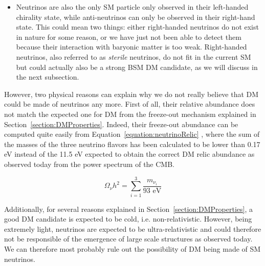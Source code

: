 \documentclass[a4paper, 10pt, openright]{report}
\begin{document}
\begin{itemize}
\item Neutrinos are also the only \ac{SM} particle only observed in their left-handed chirality state, while anti-neutrinos can only be observed in their right-hand state. This could mean two things: either right-handed neutrinos do not exist in nature for some reason, or we have just not been able to detect them because their interaction with baryonic matter is too weak. Right-handed neutrinos, also referred to as \textit{sterile} neutrinos, do not fit in the current \ac{SM} but could actually also be a strong \ac{BSM} \ac{DM} candidate, as we will discuss in the next subsection.

%
\end{itemize}

However, two physical reasons can explain why we do not really believe that \ac{DM} could be made of neutrinos any more. First of all, their relative abundance does not match the expected one for \ac{DM} from the freeze-out mechanism explained in Section~\ref{section:DMProperties}. Indeed, their freeze-out abundance can be computed quite easily from Equation~\ref{equation:neutrinoRelic} \cite{WIMPBook}, where the sum of the masses of the three neutrino flavors has been calculated to be lower than 0.17 eV \cite{NeutrinoMass} instead of the 11.5 eV expected to obtain the correct \ac{DM} relic abundance as observed today from the power spectrum of the \ac{CMB}. 

\begin{equation}
\label{equation:neutrinoRelic}
\Omega_\nu h^2 = \sum_{i=1}^3 \frac{m_{\nu_i}}{93 \text{ eV}}
\end{equation}

Additionally, for several reasons explained in Section~\ref{section:DMProperties}, a good \ac{DM} candidate is expected to be cold, i.e. non-relativistic. However, being extremely light, neutrinos are expected to be ultra-relativistic and could therefore not be responsible of the emergence of large scale structures as observed today. We can therefore most probably rule out the possibility of \ac{DM} being made of \ac{SM} neutrinos.
\end{document}
